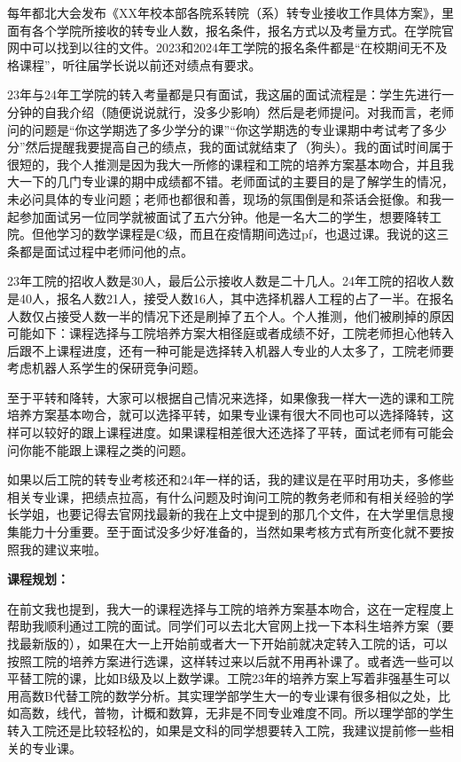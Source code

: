 \documentclass[11pt,oneside]{book}
\begin{document}
每年都北大会发布《XX年校本部各院系转院（系）转专业接收工作具体方案》，里面有各个学院所接收的转专业人数，报名条件，报名方式以及考量方式。在学院官网中可以找到以往的文件。2023和2024年工学院的报名条件都是“在校期间无不及格课程”，听往届学长说以前还对绩点有要求。

23年与24年工学院的转入考量都是只有面试，我这届的面试流程是：学生先进行一分钟的自我介绍（随便说说就行，没多少影响）然后是老师提问。对我而言，老师问的问题是“你这学期选了多少学分的课”“你这学期选的专业课期中考试考了多少分”然后提醒我要提高自己的绩点，我的面试就结束了（狗头）。我的面试时间属于很短的，我个人推测是因为我大一所修的课程和工院的培养方案基本吻合，并且我大一下的几门专业课的期中成绩都不错。老师面试的主要目的是了解学生的情况，未必问具体的专业问题；老师也都很和善，现场的氛围倒是和茶话会挺像。和我一起参加面试另一位同学就被面试了五六分钟。他是一名大二的学生，想要降转工院。但他学习的数学课程是C级，而且在疫情期间选过pf，也退过课。我说的这三条都是面试过程中老师问他的点。

23年工院的招收人数是30人，最后公示接收人数是二十几人。24年工院的招收人数是40人，报名人数21人，接受人数16人，其中选择机器人工程的占了一半。在报名人数仅占接受人数一半的情况下还是刷掉了五个人。个人推测，他们被刷掉的原因可能如下：课程选择与工院培养方案大相径庭或者成绩不好，工院老师担心他转入后跟不上课程进度，还有一种可能是选择转入机器人专业的人太多了，工院老师要考虑机器人系学生的保研竞争问题。

至于平转和降转，大家可以根据自己情况来选择，如果像我一样大一选的课和工院培养方案基本吻合，就可以选择平转，如果专业课有很大不同也可以选择降转，这样可以较好的跟上课程进度。如果课程相差很大还选择了平转，面试老师有可能会问你能不能跟上课程之类的问题。

如果以后工院的转专业考核还和24年一样的话，我的建议是在平时用功夫，多修些相关专业课，把绩点拉高，有什么问题及时询问工院的教务老师和有相关经验的学长学姐，也要记得去官网找最新的我在上文中提到的那几个文件，在大学里信息搜集能力十分重要。至于面试没多少好准备的，当然如果考核方式有所变化就不要按照我的建议来啦。

\textbf{\textbf{课程规划}}\textbf{\textbf{：}}

在前文我也提到，我大一的课程选择与工院的培养方案基本吻合，这在一定程度上帮助我顺利通过工院的面试。同学们可以去北大官网上找一下本科生培养方案（要找最新版的），如果在大一上开始前或者大一下开始前就决定转入工院的话，可以按照工院的培养方案进行选课，这样转过来以后就不用再补课了。或者选一些可以平替工院的课，比如B级及以上数学课。工院23年的培养方案上写着非强基生可以用高数B代替工院的数学分析。其实理学部学生大一的专业课有很多相似之处，比如高数，线代，普物，计概和数算，无非是不同专业难度不同。所以理学部的学生转入工院还是比较轻松的，如果是文科的同学想要转入工院，我建议提前修一些相关的专业课。
\end{document}
